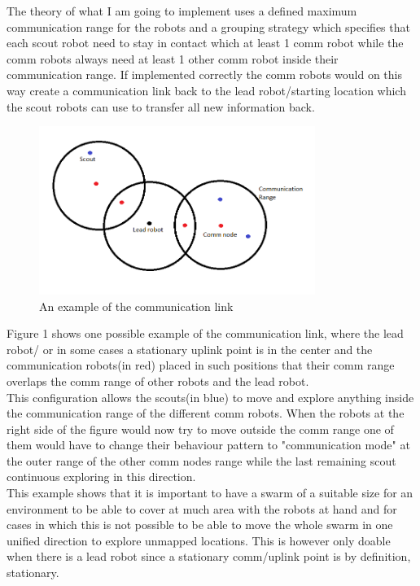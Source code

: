 \documentclass[10pt,a4paper]{article}
\begin{document}
\begin{flushleft}
The theory of what I am going to implement uses a defined maximum communication range for the robots and a grouping strategy which specifies that each scout robot need to stay in contact which at least 1 comm robot while the comm robots always need at least 1 other comm robot inside their communication range. If implemented correctly the comm robots would on this way create a communication link back to the lead robot/starting location which the scout robots can use to transfer all new information back.\\

\begin{figure}[h]
\centering
\includegraphics[width = 0.8\textwidth]{figures/comm_example.png} 
\caption{An example of the communication link}
\label{Picture 1}
\end{figure}

Figure 1 shows one possible example of the communication link, where the lead robot/ or in some cases a stationary uplink point is in the center and the communication robots(in red) placed in such positions that their comm range overlaps the comm range of other robots and the lead robot. \\
This configuration allows the scouts(in blue) to move and explore anything inside the communication range of the different comm robots. When the robots at the right side of the figure would now try to move outside the comm range one of them would have to change their behaviour pattern to "communication mode" at the outer range of the other comm nodes range while the last remaining scout continuous exploring in this direction. \\
This example shows that it is important to have a swarm of a suitable size for an environment to be able to cover at much area with the robots at hand and for cases in which this is not possible to be able to move the whole swarm in one unified direction to explore unmapped locations. This is however only doable when there is a lead robot since a stationary comm/uplink point is by definition, stationary.\\


\end{flushleft}
\end{document}
